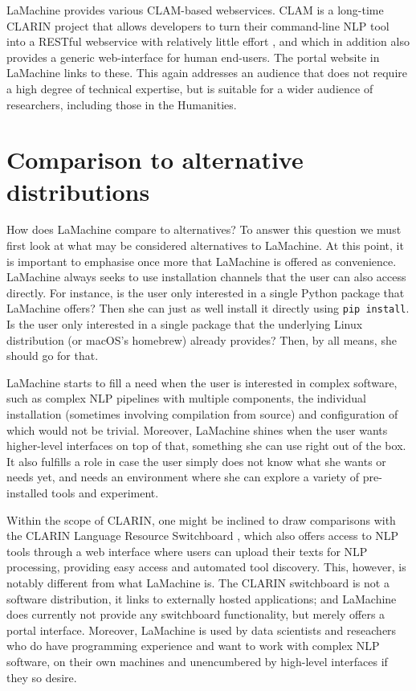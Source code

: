 \documentclass[a4paper,11pt]{article}
\begin{document}
LaMachine provides various CLAM-based webservices. CLAM is a long-time CLARIN project that allows developers to turn
their command-line NLP tool into a RESTful webservice with relatively little effort \cite{CLAMPAPER}, and which in
addition also provides a generic web-interface for human end-users. The portal website in LaMachine links to these. This
again addresses an audience that does not require a high degree of technical expertise, but is suitable for a wider
audience of researchers, including those in the Humanities.

\section{Comparison to alternative distributions}\label{sec:comparison}

How does LaMachine compare to alternatives? To answer this question we must first look at what may be considered
alternatives to LaMachine. At this point, it is important to emphasise once more that LaMachine is offered as convenience.
LaMachine always seeks to use installation channels that the user can also access directly. For instance, is the user
only interested in a single Python package that LaMachine offers? Then she can just as well install it directly using
\texttt{pip install}. Is the user only interested in a single package that  the underlying Linux distribution (or
macOS's homebrew)
already provides? Then, by all means, she should go for that.

LaMachine starts to fill a need when the user is interested in complex software, such as complex NLP pipelines with
multiple components, the individual installation (sometimes involving compilation from source) and configuration of
which would not be trivial. Moreover, LaMachine shines when the user wants higher-level interfaces on top of that,
something she can use right out of the box. It also fulfills a role in case the user simply does not know what she wants
or needs yet, and needs an environment where she can explore a variety of pre-installed tools and experiment.

Within the scope of CLARIN, one might be inclined to draw comparisons with the CLARIN Language Resource Switchboard
\cite{zinn2016clarin}, which also offers access to NLP tools through a web interface where users can upload their texts
for NLP processing, providing easy access and automated tool discovery.  This, however, is notably different from what
LaMachine is. The CLARIN switchboard is not a software distribution, it links to externally hosted applications; and
LaMachine does currently not provide any switchboard functionality, but merely offers a portal interface. Moreover,
LaMachine is used by data scientists and reseachers who do have programming experience and want to work with complex NLP
software, on their own machines and unencumbered by high-level interfaces if they so desire.
\end{document}
